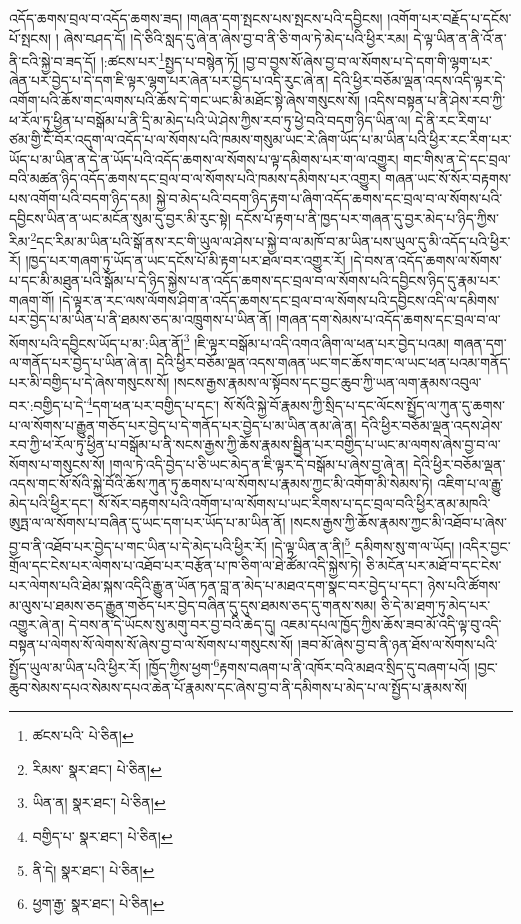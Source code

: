 འདོད་ཆགས་བྲལ་བ་འདོད་ཆགས་ཟད། །གཞན་དག་སྤངས་པས་སྤངས་པའི་དབྱིངས། །འགོག་པར་བརྗོད་པ་དངོས་པོ་སྤངས། །
ཞེས་བཤད་དོ། །དེ་ཅིའི་སླད་དུ་ཞེ་ན་ཞེས་བྱ་བ་ནི་ཅི་གལ་ཏེ་མེད་པའི་ཕྱིར་རམ། དེ་ལྟ་ཡིན་ན་ནི་འོ་ན་ནི་ངའི་སྐྱེ་བ་ཟད་དོ། །:ཚངས་པར་\footnote{ཚངས་པའི་  པེ་ཅིན། }སྤྱད་པ་བསྙེན་ཏོ། །བྱ་བ་བྱས་སོ་ཞེས་བྱ་བ་ལ་སོགས་པ་དེ་དག་གི་ལྷག་པར་ཞེན་པར་བྱེད་པ་དེ་དག་ཇི་ལྟར་ལྷག་པར་ཞེན་པར་བྱེད་པ་འདི་རུང་ཞེ་ན། དེའི་ཕྱིར་བཅོམ་ལྡན་འདས་འདི་ལྟར་དེ་འགོག་པའི་ཆོས་གང་ལགས་པའི་ཆོས་དེ་གང་ཡང་མི་མཐོང་སྟེ་ཞེས་གསུངས་སོ། །འདིས་བསྟན་པ་ནི་ཤེས་རབ་ཀྱི་ཕ་རོལ་ཏུ་ཕྱིན་པ་བསྒོམ་པ་ནི་དྲི་མ་མེད་པའི་ཡེ་ཤེས་ཀྱིས་རབ་ཏུ་ཕྱེ་བའི་བདག་ཉིད་ཡིན་ལ། དེ་ནི་རང་རིག་པ་ཙམ་གྱི་ངོ་བོར་འདུག་ལ་འདོད་པ་ལ་སོགས་པའི་ཁམས་གསུམ་ཡང་རེ་ཞིག་ཡོད་པ་མ་ཡིན་པའི་ཕྱིར་རང་རིག་པར་ཡོད་པ་མ་ཡིན་ན་དེ་ན་ཡོད་པའི་འདོད་ཆགས་ལ་སོགས་པ་ལྟ་དམིགས་པར་ག་ལ་འགྱུར། གང་གིས་ན་དེ་དང་བྲལ་བའི་མཚན་ཉིད་འདོད་ཆགས་དང་བྲལ་བ་ལ་སོགས་པའི་ཁམས་དམིགས་པར་འགྱུར། གཞན་ཡང་སོ་སོར་བརྟགས་པས་འགོག་པའི་བདག་ཉིད་དམ། སྐྱེ་བ་མེད་པའི་བདག་ཉིད་རྟག་པ་ཞིག་འདོད་ཆགས་དང་བྲལ་བ་ལ་སོགས་པའི་དབྱིངས་ཡིན་ན་ཡང་མངོན་སུམ་དུ་བྱར་མི་རུང་སྟེ། དངོས་པོ་རྟག་པ་ནི་ཁྱད་པར་གཞན་དུ་བྱར་མེད་པ་ཉིད་ཀྱིས་རིམ་\footnote{རིམས་  སྣར་ཐང་།  པེ་ཅིན། }དང་རིམ་མ་ཡིན་པའི་སྒོ་ནས་རང་གི་ཡུལ་ལ་ཤེས་པ་སྐྱེ་བ་ལ་མཁོ་བ་མ་ཡིན་པས་ཡུལ་དུ་མི་འདོད་པའི་ཕྱིར་རོ། །ཁྱད་པར་གཞག་ཏུ་ཡོད་ན་ཡང་དངོས་པོ་མི་རྟག་པར་ཐལ་བར་འགྱུར་རོ། །དེ་བས་ན་འདོད་ཆགས་ལ་སོགས་པ་དང་མི་མཐུན་པའི་སྒོམ་པ་དེ་ཉིད་སྐྱེས་པ་ན་འདོད་ཆགས་དང་བྲལ་བ་ལ་སོགས་པའི་དབྱིངས་ཉིད་དུ་རྣམ་པར་གཞག་གོ། །དེ་ལྟར་ན་རང་ལས་ལོགས་ཤིག་ན་འདོད་ཆགས་དང་བྲལ་བ་ལ་སོགས་པའི་དབྱིངས་འདི་ལ་དམིགས་པར་བྱེད་པ་མ་ཡིན་པ་ནི་ཐམས་ཅད་མ་འཁྲུགས་པ་ཡིན་ནོ། །གཞན་དག་སེམས་པ་འདོད་ཆགས་དང་བྲལ་བ་ལ་སོགས་པའི་དབྱིངས་ཡོད་པ་མ་:ཡིན་ནོ།\footnote{ཡིན་ན།  སྣར་ཐང་།  པེ་ཅིན། } །ཇི་ལྟར་བསྒོམ་པ་འདི་འགའ་ཞིག་ལ་ཕན་པར་བྱེད་པའམ། གཞན་དག་ལ་གནོད་པར་བྱེད་པ་ཡིན་ཞེ་ན། དེའི་ཕྱིར་བཅོམ་ལྡན་འདས་གཞན་ཡང་གང་ཆོས་གང་ལ་ཡང་ཕན་པའམ་གནོད་པར་མི་བགྱིད་པ་དེ་ཞེས་གསུངས་སོ། །སངས་རྒྱས་རྣམས་ལ་སྟོབས་དང་བྱང་ཆུབ་ཀྱི་ཡན་ལག་རྣམས་འབུལ་བར་:བགྱིད་པ་དེ་\footnote{བགྱིད་པ་  སྣར་ཐང་།  པེ་ཅིན། }དག་ཕན་པར་བགྱིད་པ་དང་། སོ་སོའི་སྐྱེ་བོ་རྣམས་ཀྱི་སྲིད་པ་དང་ལོངས་སྤྱོད་ལ་ཀུན་དུ་ཆགས་པ་ལ་སོགས་པ་རྒྱུན་གཅོད་པར་བྱེད་པ་དེ་གནོད་པར་བྱེད་པ་མ་ཡིན་ནམ་ཞེ་ན། དེའི་ཕྱིར་བཅོམ་ལྡན་འདས་ཤེས་རབ་ཀྱི་ཕ་རོལ་ཏུ་ཕྱིན་པ་བསྒོམ་པ་ནི་སངས་རྒྱས་ཀྱི་ཆོས་རྣམས་སྦྱིན་པར་བགྱིད་པ་ཡང་མ་ལགས་ཞེས་བྱ་བ་ལ་སོགས་པ་གསུངས་སོ། །གལ་ཏེ་འདི་བྱེད་པ་ཅི་ཡང་མེད་ན་ཇི་ལྟར་དེ་བསྒོམ་པ་ཞེས་བྱ་ཞེ་ན། དེའི་ཕྱིར་བཅོམ་ལྡན་འདས་གང་སོ་སོའི་སྐྱེ་བོའི་ཆོས་ཀུན་ཏུ་ཆགས་པ་ལ་སོགས་པ་རྣམས་ཀྱང་མི་འགོག་མི་སེམས་ཏེ། འཇིག་པ་ལ་རྒྱུ་མེད་པའི་ཕྱིར་དང་། སོ་སོར་བརྟགས་པའི་འགོག་པ་ལ་སོགས་པ་ཡང་རིགས་པ་དང་བྲལ་བའི་ཕྱིར་ནམ་མཁའི་ཨུཏྤ་ལ་ལ་སོགས་པ་བཞིན་དུ་ཡང་དག་པར་ཡོད་པ་མ་ཡིན་ནོ། །སངས་རྒྱས་ཀྱི་ཆོས་རྣམས་ཀྱང་མི་འཐོབ་པ་ཞེས་བྱ་བ་ནི་འཐོབ་པར་བྱེད་པ་གང་ཡིན་པ་དེ་མེད་པའི་ཕྱིར་རོ། །དེ་ལྟ་ཡིན་ན་ནི།\footnote{ནི་དེ།  སྣར་ཐང་།  པེ་ཅིན། } དམིགས་སུ་ག་ལ་ཡོད། །འདིར་བྱང་གྲོལ་དང་ངེས་པར་ལེགས་པ་འཐོབ་པར་བརྩོན་པ་ཁ་ཅིག་ལ་ཐེ་ཚོམ་འདི་སྐྱེས་ཏེ། ཅི་མངོན་པར་མཐོ་བ་དང་ངེས་པར་ལེགས་པའི་ཐེམ་སྐས་འདིའི་རྒྱུ་ན་ཡོན་ཏན་བླ་ན་མེད་པ་མཐའ་དག་སྣང་བར་བྱེད་པ་དང་། ཉེས་པའི་ཚོགས་མ་ལུས་པ་ཐམས་ཅད་རྒྱུན་གཅོད་པར་བྱེད་བཞིན་དུ་དུས་ཐམས་ཅད་དུ་གནས་སམ། ཅི་དེ་མ་ཐག་ཏུ་མེད་པར་འགྱུར་ཞེ་ན། དེ་བས་ན་དེ་ཡོངས་སུ་མགུ་བར་བྱ་བའི་ཆེད་དུ། འཇམ་དཔལ་ཁྱོད་ཀྱིས་ཆོས་ཟབ་མོ་འདི་ལྟ་བུ་འདི་བསྟན་པ་ལེགས་སོ་ལེགས་སོ་ཞེས་བྱ་བ་ལ་སོགས་པ་གསུངས་སོ། །ཟབ་མོ་ཞེས་བྱ་བ་ནི་ཉན་ཐོས་ལ་སོགས་པའི་སྤྱོད་ཡུལ་མ་ཡིན་པའི་ཕྱིར་རོ། །ཁྱོད་ཀྱིས་ཕྱག་\footnote{ཕྱག་རྒྱ་  སྣར་ཐང་།  པེ་ཅིན། }རྟགས་བཞག་པ་ནི་འཁོར་བའི་མཐའ་སྲིད་དུ་བཞག་པའོ། །བྱང་ཆུབ་སེམས་དཔའ་སེམས་དཔའ་ཆེན་པོ་རྣམས་དང་ཞེས་བྱ་བ་ནི་དམིགས་པ་མེད་པ་ལ་སྤྱོད་པ་རྣམས་སོ། 